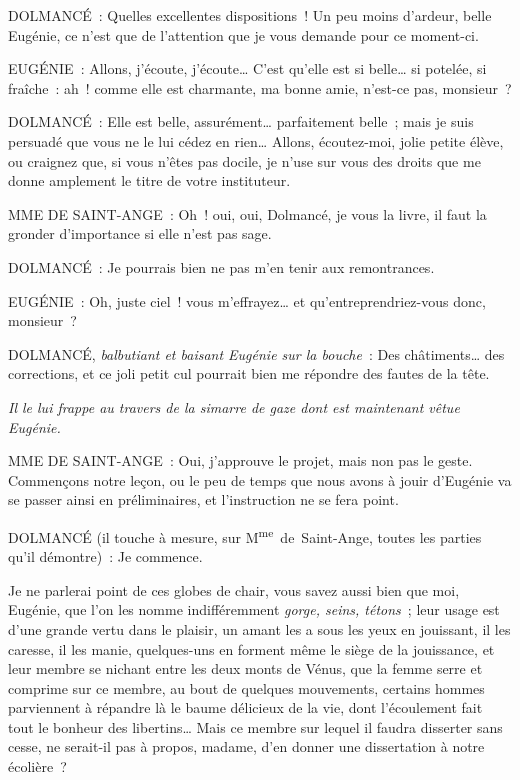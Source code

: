 \documentclass[french,twoside]{book} %
\begin{document}
\noindent DOLMANCÉ : Quelles excellentes dispositions ! Un peu moins d’ardeur, belle Eugénie, ce n’est que de l’attention que je vous demande pour ce moment-ci.\par
EUGÉNIE : Allons, j’écoute, j’écoute… C’est qu’elle est si belle… si potelée, si fraîche : ah ! comme elle est charmante, ma bonne amie, n’est-ce pas, monsieur ?\par
DOLMANCÉ : Elle est belle, assurément… parfaitement belle ; mais je suis persuadé que vous ne le lui cédez en rien… Allons, écoutez-moi, jolie petite élève, ou craignez que, si vous n’êtes pas docile, je n’use sur vous des droits que me donne amplement le titre de votre instituteur.\par
MME DE SAINT-ANGE : Oh ! oui, oui, Dolmancé, je vous la livre, il faut la gronder d’importance si elle n’est pas sage.\par
DOLMANCÉ : Je pourrais bien ne pas m’en tenir aux remontrances.\par
EUGÉNIE : Oh, juste ciel ! vous m’effrayez… et qu’entreprendriez-vous donc, monsieur ?\par
DOLMANCÉ, {\itshape balbutiant et baisant Eugénie sur la bouche} : Des châtiments… des corrections, et ce joli petit cul pourrait bien me répondre des fautes de la tête.\par
{\itshape Il le lui frappe au travers de la simarre de gaze dont est maintenant vêtue Eugénie.}\par
MME DE SAINT-ANGE : Oui, j’approuve le projet, mais non pas le geste. Commençons notre leçon, ou le peu de temps que nous avons à jouir d’Eugénie va se passer ainsi en préliminaires, et l’instruction ne se fera point.\par
DOLMANCÉ (il touche à mesure, sur M\textsuperscript{me} de Saint-Ange, toutes les parties qu’il démontre) : Je commence.\par
Je ne parlerai point de ces globes de chair, vous savez aussi bien que moi, Eugénie, que l’on les nomme indifféremment {\itshape gorge, seins, tétons} ; leur usage est d’une grande vertu dans le plaisir, un amant les a sous les yeux en jouissant, il les caresse, il les manie, quelques-uns en forment même le siège de la jouissance, et leur membre se nichant entre les deux monts de Vénus, que la femme serre et comprime sur ce membre, au bout de quelques mouvements, certains hommes parviennent à répandre là le baume délicieux de la vie, dont l’écoulement fait tout le bonheur des libertins… Mais ce membre sur lequel il faudra disserter sans cesse, ne serait-il pas à propos, madame, d’en donner une dissertation à notre écolière ?\par
\end{document}
